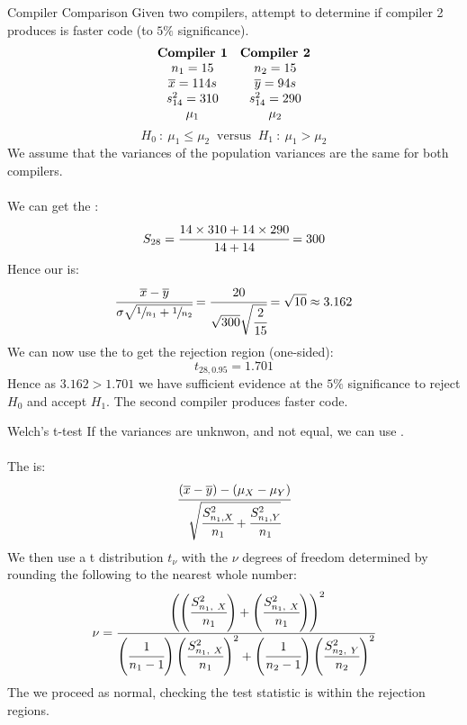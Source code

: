 \begin{examplebox}{Compiler Comparison}
	Given two compilers, attempt to determine if compiler 2 produces is faster code (to $5\%$ significance).
	\[\begin{matrix}
			\text{\textbf{Compiler 1}} & \text{\textbf{Compiler 2}} \\
			n_1 = 15                   & n_2 = 15                   \\
			\overline{x} = 114s        & \overline{y} = 94s         \\
			s_{14}^2 = 310             & s_{14}^2 = 290             \\
			\mu_1                      & \mu_2                      \\
		\end{matrix}\]
	\[H_0 \ : \ \mu_1 \leq \mu_2 \ \text{  versus  } \ H_1 \ : \ \mu_1 > \mu_2\]
	We assume that the variances of the population variances are the same for both compilers.
	\\
	\\ We can get the :
	\[S_{28} = \cfrac{14 \times 310 + 14 \times 290}{14 + 14} = 300\]
	Hence our  is:
	\[\cfrac{\overline{x} - \overline{y}}{\sigma \sqrt{\sfrac{1}{n_1} + \sfrac{1}{n_2}}} = \cfrac{20}{\sqrt{300}\sqrt{\cfrac{2}{15}}} = \sqrt{10} \approx 3.162\]
	We can now use the  to get the rejection region (one-sided):
	\[t_{28, 0.95} = 1.701\]
	Hence as $3.162 > 1.701$ we have sufficient evidence at the $5\%$ significance to reject $H_0$ and accept $H_1$. The second compiler produces faster code.
\end{examplebox}


\begin{sidenotebox}{Welch's t-test}
	If the variances are unknwon, and not equal, we can use .
	\\
	\\ The  is:
	\[\cfrac{(\overline{x} - \overline{y}) - (\mu_X - \mu_Y)}{\sqrt{\cfrac{S_{n_1, X}^2}{n_1} + \cfrac{S_{n_1, Y}^2}{n_1}}}\]
	We then use a t distribution $t_\nu$ with the $\nu$ degrees of freedom determined by rounding the following to the nearest whole number:
	\[\nu = \cfrac{\left(\left(\cfrac{S^2_{n_1, \ X}}{n_1}\right)+ \left(\cfrac{S^2_{n_1, \ X}}{n_1}\right) \right)^2}{\left(\cfrac{1}{n_1 - 1}\right)\left(\cfrac{S^2_{n_1, \ X}}{n_1}\right)^2 + \left(\cfrac{1}{n_2 - 1}\right)\left(\cfrac{S^2_{n_2, \ Y}}{n_2}\right)^2}\]
	The we proceed as normal, checking the test statistic is within the rejection regions.
\end{sidenotebox}

